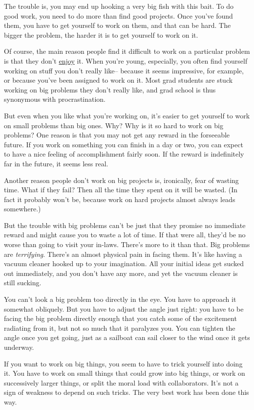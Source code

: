 The trouble is, you may end up hooking a very big fish with this bait.
To do good work, you need to do more than find good projects. Once
you've found them, you have to get yourself to work on them, and that
can be hard. The bigger the problem, the harder it is to get yourself to
work on it.

Of course, the main reason people find it difficult to work on a
particular problem is that they don't \href{hs.html}{enjoy} it. When
you're young, especially, you often find yourself working on stuff you
don't really like-- because it seems impressive, for example, or because
you've been assigned to work on it. Most grad students are stuck working
on big problems they don't really like, and grad school is thus
synonymous with procrastination.

But even when you like what you're working on, it's easier to get
yourself to work on small problems than big ones. Why? Why is it so hard
to work on big problems? One reason is that you may not get any reward
in the forseeable future. If you work on something you can finish in a
day or two, you can expect to have a nice feeling of accomplishment
fairly soon. If the reward is indefinitely far in the future, it seems
less real.

Another reason people don't work on big projects is, ironically, fear of
wasting time. What if they fail? Then all the time they spent on it will
be wasted. (In fact it probably won't be, because work on hard projects
almost always leads somewhere.)

But the trouble with big problems can't be just that they promise no
immediate reward and might cause you to waste a lot of time. If that
were all, they'd be no worse than going to visit your in-laws. There's
more to it than that. Big problems are \emph{terrifying}. There's an
almost physical pain in facing them. It's like having a vacuum cleaner
hooked up to your imagination. All your initial ideas get sucked out
immediately, and you don't have any more, and yet the vacuum cleaner is
still sucking.

You can't look a big problem too directly in the eye. You have to
approach it somewhat obliquely. But you have to adjust the angle just
right: you have to be facing the big problem directly enough that you
catch some of the excitement radiating from it, but not so much that it
paralyzes you. You can tighten the angle once you get going, just as a
sailboat can sail closer to the wind once it gets underway.

If you want to work on big things, you seem to have to trick yourself
into doing it. You have to work on small things that could grow into big
things, or work on successively larger things, or split the moral load
with collaborators. It's not a sign of weakness to depend on such
tricks. The very best work has been done this way.

